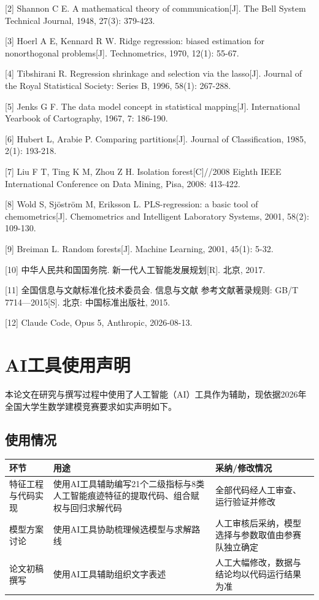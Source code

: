 \documentclass[withoutpreface]{cumcmthesis}
\begin{document}
[2] Shannon C E. A mathematical theory of communication[J]. The Bell System Technical Journal, 1948, 27(3): 379-423.

[3] Hoerl A E, Kennard R W. Ridge regression: biased estimation for nonorthogonal problems[J]. Technometrics, 1970, 12(1): 55-67.

[4] Tibshirani R. Regression shrinkage and selection via the lasso[J]. Journal of the Royal Statistical Society: Series B, 1996, 58(1): 267-288.

[5] Jenks G F. The data model concept in statistical mapping[J]. International Yearbook of Cartography, 1967, 7: 186-190.

[6] Hubert L, Arabie P. Comparing partitions[J]. Journal of Classification, 1985, 2(1): 193-218.

[7] Liu F T, Ting K M, Zhou Z H. Isolation forest[C]//2008 Eighth IEEE International Conference on Data Mining, Pisa, 2008: 413-422.

[8] Wold S, Sjöström M, Eriksson L. PLS-regression: a basic tool of chemometrics[J]. Chemometrics and Intelligent Laboratory Systems, 2001, 58(2): 109-130.

[9] Breiman L. Random forests[J]. Machine Learning, 2001, 45(1): 5-32.

[10] 中华人民共和国国务院. 新一代人工智能发展规划[R]. 北京, 2017.

[11] 全国信息与文献标准化技术委员会. 信息与文献 参考文献著录规则: GB/T 7714—2015[S]. 北京: 中国标准出版社, 2015.

[12] Claude Code, Opus 5, Anthropic, 2026-08-13.

\section{AI工具使用声明}
本论文在研究与撰写过程中使用了人工智能（AI）工具作为辅助，现依据2026年全国大学生数学建模竞赛要求如实声明如下。

\subsection{使用情况}
\begin{table}[htbp]
\centering
\small
\begin{tabularx}{\textwidth}{XXX}
\toprule
环节 & 用途 & 采纳/修改情况 \\
\midrule
特征工程与代码实现 & 使用AI工具辅助编写21个二级指标与8类人工智能痕迹特征的提取代码、组合赋权与回归求解代码 & 全部代码经人工审查、运行验证并修改 \\
模型方案讨论 & 使用AI工具协助梳理候选模型与求解路线 & 人工审核后采纳，模型选择与参数取值由参赛队独立确定 \\
论文初稿撰写 & 使用AI工具辅助组织文字表述 & 人工大幅修改，数据与结论均以代码运行结果为准 \\
\bottomrule
\end{tabularx}
\end{table}
\end{document}
